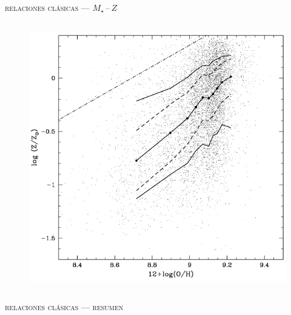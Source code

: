 \documentclass[xcolor=dvipsnames,fleqn,hyperref={colorlinks,citecolor=black,linkcolor=black,urlcolor=black}]{beamer}
\begin{document}
\begin{frame}{\textsc{relaciones clásicas --- $M_\star\,$--$\,Z$}}
\begin{columns}
\begin{figure}
\includegraphics[scale=0.6]{img/gallazzi2005-9}
\end{figure}

\end{columns}
\end{frame}

\begin{frame}{\textsc{relaciones clásicas --- resumen}}
\end{frame}
\end{document}
